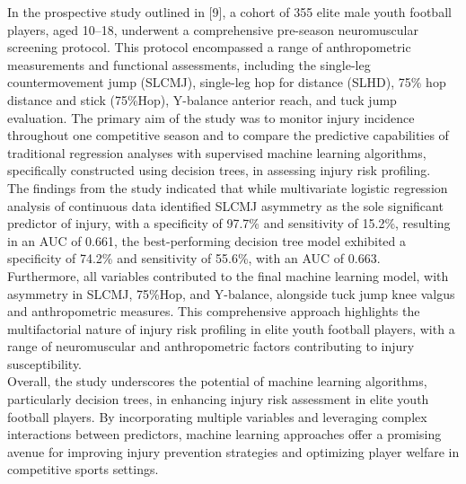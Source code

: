\documentclass[12pt, English]{article}
\begin{document}
\begin{normalsize}
In the prospective study outlined in [9], a cohort of 355 elite male youth football players, aged 10–18, underwent a comprehensive pre-season neuromuscular screening protocol. This protocol encompassed a range of anthropometric measurements and functional assessments, including the single-leg countermovement jump (SLCMJ), single-leg hop for distance (SLHD), 75\% hop distance and stick (75\%Hop), Y-balance anterior reach, and tuck jump evaluation. The primary aim of the study was to monitor injury incidence throughout one competitive season and to compare the predictive capabilities of traditional regression analyses with supervised machine learning algorithms, specifically constructed using decision trees, in assessing injury risk profiling.\\
The findings from the study indicated that while multivariate logistic regression analysis of continuous data identified SLCMJ asymmetry as the sole significant predictor of injury, with a specificity of 97.7\% and sensitivity of 15.2\%, resulting in an AUC of 0.661, the best-performing decision tree model exhibited a specificity of 74.2\% and sensitivity of 55.6\%, with an AUC of 0.663.\\
Furthermore, all variables contributed to the final machine learning model, with asymmetry in SLCMJ, 75\%Hop, and Y-balance, alongside tuck jump knee valgus and anthropometric measures. This comprehensive approach highlights the multifactorial nature of injury risk profiling in elite youth football players, with a range of neuromuscular and anthropometric factors contributing to injury susceptibility.\\
Overall, the study underscores the potential of machine learning algorithms, particularly decision trees, in enhancing injury risk assessment in elite youth football players. By incorporating multiple variables and leveraging complex interactions between predictors, machine learning approaches offer a promising avenue for improving injury prevention strategies and optimizing player welfare in competitive sports settings.
\\


\end{normalsize}
\end{document}
